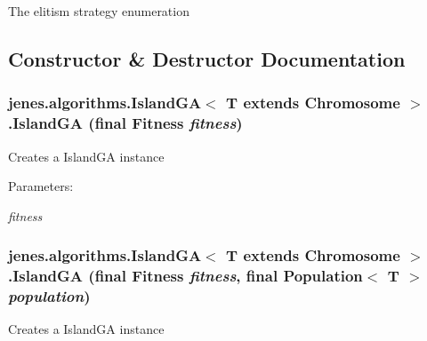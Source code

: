 The elitism strategy enumeration 

\subsection{Constructor \& Destructor Documentation}
\hypertarget{classjenes_1_1algorithms_1_1_island_g_a_3_01_t_01extends_01_chromosome_01_4_e36c7bc43e9b6f50a74cd3c2be85d17b}{
\subsubsection[IslandGA]{\setlength{\rightskip}{0pt plus 5cm}jenes.algorithms.IslandGA$<$ T extends Chromosome $>$.IslandGA (final Fitness {\em fitness})}}
\label{classjenes_1_1algorithms_1_1_island_g_a_3_01_t_01extends_01_chromosome_01_4_e36c7bc43e9b6f50a74cd3c2be85d17b}


Creates a IslandGA instance

\begin{Desc}
\item[Parameters:]
\begin{description}
\item[{\em fitness}]\end{description}
\end{Desc}
\hypertarget{classjenes_1_1algorithms_1_1_island_g_a_3_01_t_01extends_01_chromosome_01_4_7e50ffddeef3cd18e479696e1d7258e4}{
\subsubsection[IslandGA]{\setlength{\rightskip}{0pt plus 5cm}jenes.algorithms.IslandGA$<$ T extends Chromosome $>$.IslandGA (final Fitness {\em fitness}, \/  final Population$<$ T $>$ {\em population})}}
\label{classjenes_1_1algorithms_1_1_island_g_a_3_01_t_01extends_01_chromosome_01_4_7e50ffddeef3cd18e479696e1d7258e4}


Creates a IslandGA instance

